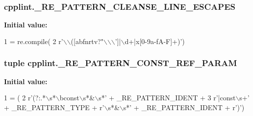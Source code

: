 \subsubsection[{\texorpdfstring{\+\_\+\+R\+E\+\_\+\+P\+A\+T\+T\+E\+R\+N\+\_\+\+C\+L\+E\+A\+N\+S\+E\+\_\+\+L\+I\+N\+E\+\_\+\+E\+S\+C\+A\+P\+ES}{_RE_PATTERN_CLEANSE_LINE_ESCAPES}}]{\setlength{\rightskip}{0pt plus 5cm}cpplint.\+\_\+\+R\+E\+\_\+\+P\+A\+T\+T\+E\+R\+N\+\_\+\+C\+L\+E\+A\+N\+S\+E\+\_\+\+L\+I\+N\+E\+\_\+\+E\+S\+C\+A\+P\+ES\hspace{0.3cm}{\ttfamily [private]}}\hypertarget{namespacecpplint_acb6f93120f1c7ff091fd9dea38ee89df}{}\label{namespacecpplint_acb6f93120f1c7ff091fd9dea38ee89df}
{\bfseries Initial value\+:}
\begin{DoxyCode}
1 = re.compile(
2     \textcolor{stringliteral}{r'\(\backslash\)\(\backslash\)([abfnrtv?"\(\backslash\)\(\backslash\)\(\backslash\)']|\(\backslash\)d+|x[0-9a-fA-F]+)'})
\end{DoxyCode}
\subsubsection[{\texorpdfstring{\+\_\+\+R\+E\+\_\+\+P\+A\+T\+T\+E\+R\+N\+\_\+\+C\+O\+N\+S\+T\+\_\+\+R\+E\+F\+\_\+\+P\+A\+R\+AM}{_RE_PATTERN_CONST_REF_PARAM}}]{\setlength{\rightskip}{0pt plus 5cm}tuple cpplint.\+\_\+\+R\+E\+\_\+\+P\+A\+T\+T\+E\+R\+N\+\_\+\+C\+O\+N\+S\+T\+\_\+\+R\+E\+F\+\_\+\+P\+A\+R\+AM\hspace{0.3cm}{\ttfamily [private]}}\hypertarget{namespacecpplint_adee0ad93201bfc951bff10a8725c49a1}{}\label{namespacecpplint_adee0ad93201bfc951bff10a8725c49a1}
{\bfseries Initial value\+:}
\begin{DoxyCode}
1 = (
2     \textcolor{stringliteral}{r'(?:.*\(\backslash\)s*\(\backslash\)bconst\(\backslash\)s*&\(\backslash\)s*'} + \_RE\_PATTERN\_IDENT +
3     \textcolor{stringliteral}{r'|const\(\backslash\)s+'} + \_RE\_PATTERN\_TYPE + \textcolor{stringliteral}{r'\(\backslash\)s*&\(\backslash\)s*'} + \_RE\_PATTERN\_IDENT + \textcolor{stringliteral}{r')'})
\end{DoxyCode}
